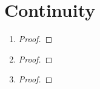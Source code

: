 \documentclass[paper=a4, fontsize=11pt]{scrartcl} %
\numberwithin{equation}{section} %
\numberwithin{figure}{section} %
\numberwithin{table}{section} %
\begin{document}

\section{Continuity}

\begin{enumerate}
	\item
		\begin{proof}

		\end{proof}
	
	\item
		\begin{proof}

		\end{proof}
	
	\item
		\begin{proof}

		\end{proof}
\end{enumerate}
\end{document}

